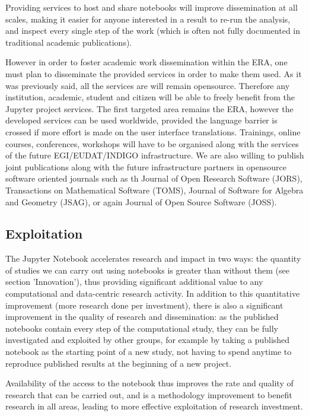 Providing services to host and share notebooks will improve
dissemination at all scales, making it easier for anyone interested in
a result to re-run the analysis, and inspect every single step of the
work (which is often not fully documented in traditional academic
publications).

However in order to foster academic work dissemination within the ERA,
one must plan to disseminate the provided services in order to make them used.
As it was previously said, all the services are will remain opensource. Therefore any
institution, academic, student and citizen will be able to freely benefit from the 
Jupyter project services. The first targeted area remains the ERA, however the developed
services can be used worldwide, provided the language barrier is crossed if more effort is
made on the user interface translations.
Trainings, online courses, conferences, workshops will have to be organised along with the services of the future EGI/EUDAT/INDIGO infrastructure.
We are also willing to publish joint publications along with the future infrastructure partners in opensource software oriented journals such as th Journal of Open Research Software (JORS), Transactions on Mathematical Software (TOMS), Journal of Software for Algebra and Geometry (JSAG), or again Journal of Open Source Software (JOSS).


\subsection{Exploitation}

The Jupyter Notebook accelerates research and impact in two ways: the
quantity of studies we can carry out using notebooks is greater than
without them (see section 'Innovation'), thus providing significant
additional value to any computational and data-centric research
activity. In addition to this quantitative improvement (more research
done per investment), there is also a significant improvement in the
quality of research and dissemination: as the published notebooks
contain every step of the computational study, they can be fully
investigated and exploited by other groups, for example by taking a
published notebook as the starting point of a new study, not having to
spend anytime to reproduce published results at the beginning of a new
project.

Availability of the access to the notebook thus improves the rate and
quality of research that can be carried out, and is a methodology
improvement to benefit research in all areas, leading to more
effective exploitation of research investment.

